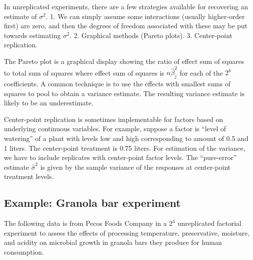 \documentclass[
]{book}
\begin{document}
In unreplicated experiments, there are a few strategies available for recovering an estimate of \(\sigma^2\).
1. We can simply assume some interactions (usually higher-order first) are zero, and then the degrees of freedom associated with these may be put towards estimating \(\sigma^2\).
2. Graphical methods (Pareto plots).
3. Center-point replication.

The Pareto plot is a graphical display showing the ratio of effect sum of squares to total sum of squares where effect sum of squares is \(n\hat\beta_j^2\) for each of the \(2^k\) coefficients. A common technique is to use the effects with smallest sums of squares to pool to obtain a variance estimate. The resulting variance estimate is likely to be an underestimate.

Center-point replication is sometimes implementable for factors based on underlying continuous variables. For example, suppose a factor is ``level of watering'' of a plant with levels low and high corresponding to amount of 0.5 and 1 liters. The center-point treatment is 0.75 liters. For estimation of the variance, we have to include replicates with center-point factor levels. The ``pure-error'' estimate \(\hat\sigma^2\) is given by the sample variance of the responses at center-point treatment levels.

\hypertarget{example-granola-bar-experiment}{%
\subsection{Example: Granola bar experiment}\label{example-granola-bar-experiment}}

The following data is from Pecos Foods Company in a \(2^4\) unreplicated factorial experiment to assess the effects of processing temperature, preservative, moisture, and acidity on microbial growth in granola bars they produce for human consumption.
\end{document}
